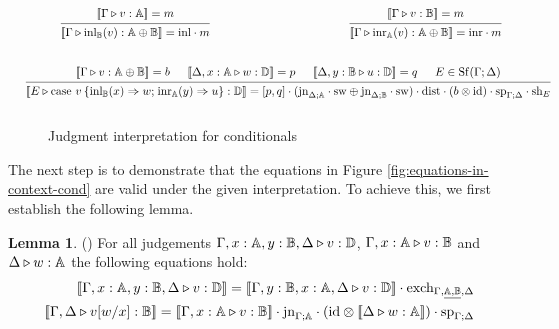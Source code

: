 \documentclass[10pt,a4paper]{amsart}
\theoremstyle{definition}
\theoremstyle{definition}
\theoremstyle{definition}
\newtheorem{lemma}[definition]{Lemma}
\theoremstyle{definition}
\theoremstyle{definition}
\theoremstyle{definition}
\begin{document}
\begin{figure}[H]
  \begin{equation*}
  \begin{aligned}
  &\hspace{10pt}
  \begin{prooftree}
      \hypo{ [\![\Gamma \vljud v: \typeA]\!] = m }
      \infer1[]{ [\![ \Gamma \vljud \text{inl}_{\typeB} (v):  \typeA \oplus \typeB  ]\!] = \inl  \comp m}
  \end{prooftree}
  \hspace{120pt}
  \begin{prooftree}
    \hypo{ [\![\Gamma \vljud v: \typeB]\!] = m }
    \infer1[]{ [\![ \Gamma \vljud \text{inr}_{\typeA} (v):  \typeA \oplus \typeB  ]\!] = \inr  \comp m}
\end{prooftree}
  \\[20pt]
  &\hspace{-20pt}
  \begin{prooftree}
      \hypo{[\![\Gamma\vljud v: \typeA \oplus \typeB ]\!] = b}
      \hypo{[\![\Delta, x:\typeA \vljud w: \typeD ]\!] = p}
      \hypo{ [\![\Delta,y:\typeB \vljud u: \typeD ]\!] = q }
      \hypo{E \in \Shuff(\Gamma; \Delta)}
      \infer4[]{ [\![E \vljud \text{case } v \hspace{2pt}  \{\text{inl}_{\typeB} (x) \Rightarrow w ; \hspace{1pt} \text{inr}_{\typeA} (y) \Rightarrow u\}: \typeD ]\!] =   [p,q] \comp (\text{jn}_{\Delta;\typeA}\comp \sw \oplus \text{jn}_{\Delta;\typeB}\comp \sw) \comp \dist \comp (b \otimes \text{id}) \cdot \text{sp}_{\Gamma;\Delta} \cdot \text{sh}_{E}}
  \end{prooftree}
  \\[10pt]
  \end{aligned}
  \end{equation*}
  \caption{Judgment interpretation for conditionals}
\label{fig:denotational_sem cond}
\end{figure}

The next step is to demonstrate that the equations in Figure \ref{fig:equations-in-context-cond} are valid under the given interpretation. To achieve this, we first establish the following lemma.

\begin{lemma} \label{lem_interpret_exch:sub} () For all judgements $\Gamma,x:\mathbb{A}, y:\mathbb{B}, \Delta \triangleright v: \mathbb{D}$, $\Gamma,x:\mathbb{A} \triangleright v: \mathbb{B}$ and $\Delta \triangleright w: \mathbb{A}$  the following equations hold: 
  \begin{equation*}
\begin{split}
  [\![\Gamma,x:\typeA, y:\typeB, \Delta \vljud v: \typeD]\!] = [\![\Gamma,y:\typeB,x:\typeA,  \Delta \vljud v: \typeD]\! ] \cdot \text{exch}_{\Gamma, \underline{ \typeA, \typeB} ,\Delta} \\
  [\![\Gamma, \Delta \vljud v[w/x]: \typeB]\!] = [\![\Gamma, x:\typeA \vljud v: \typeB]\!]\cdot \text{jn}_{\Gamma;\typeA} \cdot (\text{id} \otimes [\![ \Delta  \vljud w: \typeA]\!] ) \cdot \text{sp}_{\Gamma;\Delta} 
\end{split}
  \end{equation*}
\end{lemma}
\end{document}

